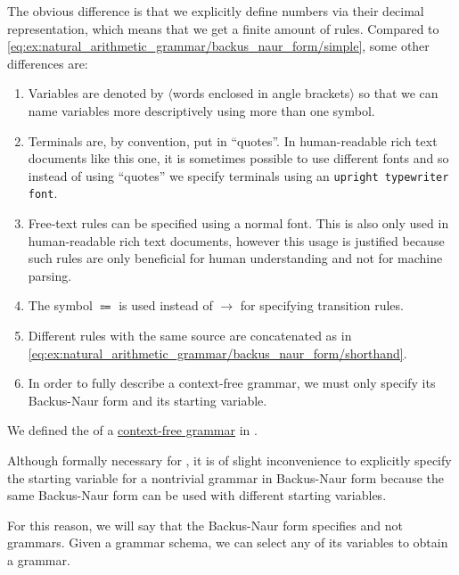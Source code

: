\begin{example}
  The obvious difference is that we explicitly define numbers via their decimal representation, which means that we get a finite amount of rules. Compared to \eqref{eq:ex:natural_arithmetic_grammar/backus_naur_form/simple}, some other differences are:
  \begin{enumerate}
    \item Variables are denoted by \( \langle \)words enclosed in angle brackets\( \rangle \) so that we can name variables more descriptively using more than one symbol.
    \item Terminals are, by convention, put in \enquote{quotes}. In human-readable rich text documents like this one, it is sometimes possible to use different fonts and so instead of using \enquote{quotes} we specify terminals using an \texttt{upright typewriter font}.
    \item Free-text rules can be specified using a normal font. This is also only used in human-readable rich text documents, however this usage is justified because such rules are only beneficial for human understanding and not for machine parsing.
    \item The symbol \( \Coloneqq \) is used instead of \( \to \) for specifying transition rules.
    \item Different rules with the same source are concatenated as in \eqref{eq:ex:natural_arithmetic_grammar/backus_naur_form/shorthand}.
    \item In order to fully describe a context-free grammar, we must only specify its Backus-Naur form and its starting variable.
  \end{enumerate}
\end{example}

\begin{definition}\label{def:backus_naur_form}
  We defined the  of a \hyperref[def:grammar/context_free]{context-free grammar} in .

  Although formally necessary for , it is of slight inconvenience to explicitly specify the starting variable for a nontrivial grammar in Backus-Naur form because the same Backus-Naur form can be used with different starting variables.

  For this reason, we will say that the Backus-Naur form specifies  and not grammars. Given a grammar schema, we can select any of its variables to obtain a grammar.
\end{definition}

